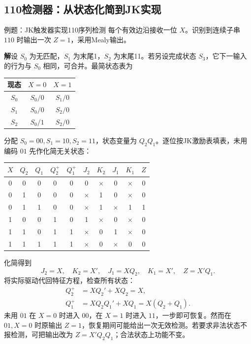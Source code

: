 \documentclass[UTF8,fontset=none,zihao=-4,a4paper]{ctexart}
\newcommand{\sol}{\par\noindent\textbf{解}\quad}
\begin{document}
\subsection{110检测器：从状态化简到JK实现}
\begin{infobox}{例题：JK触发器实现110序列检测}
每个有效边沿接收一位 $X$。识别到连续子串 $110$ 时输出一次 $Z=1$，采用Mealy输出。
\end{infobox}
\sol 设 $S_0$ 为无匹配，$S_1$ 为末尾1，$S_2$ 为末尾11。若另设完成状态 $S_3$，它下一输入的行为与 $S_0$ 相同，可合并。最简状态表为
\begin{center}
\begin{tabular}{c cc}
\toprule 现态&$X=0$&$X=1$\\\midrule
$S_0$&$S_0/0$&$S_1/0$\\$S_1$&$S_0/0$&$S_2/0$\\$S_2$&$S_0/1$&$S_2/0$\\\bottomrule
\end{tabular}
\end{center}
分配 $S_0=00,S_1=10,S_2=11$，状态变量为 $Q_2Q_1$。逐位按JK激励表填表，未用编码 $01$ 先作化简无关状态：
\begin{center}
\begin{tabular}{c cc cc cc cc c}
\toprule $X$&$Q_2$&$Q_1$&$Q_2^+$&$Q_1^+$&$J_2$&$K_2$&$J_1$&$K_1$&$Z$\\\midrule
0&0&0&0&0&0&$\times$&0&$\times$&0\\
0&1&0&0&0&$\times$&1&0&$\times$&0\\
0&1&1&0&0&$\times$&1&$\times$&1&1\\
1&0&0&1&0&1&$\times$&0&$\times$&0\\
1&1&0&1&1&$\times$&0&1&$\times$&0\\
1&1&1&1&1&$\times$&0&$\times$&0&0\\\bottomrule
\end{tabular}
\end{center}
化简得到
\[
J_2=X,\quad K_2=X',\quad J_1=XQ_2,\quad K_1=X',\quad Z=X'Q_1.
\]
将实际驱动代回特征方程，检查所有状态：
\begin{align*}
Q_2^+&=XQ_2'+XQ_2=X,\\
Q_1^+&=XQ_2Q_1'+XQ_1=X(Q_2+Q_1).
\end{align*}
未用 $01$ 在 $X=0$ 时进入 $00$，在 $X=1$ 时进入 $11$，一步即可恢复。然而在 $01,X=0$ 时原输出 $Z=1$，恢复期间可能给出一次无效检测。若要求非法状态不报检测，可把输出改为 $Z=X'Q_2Q_1$；合法状态上功能不变。
\end{document}
